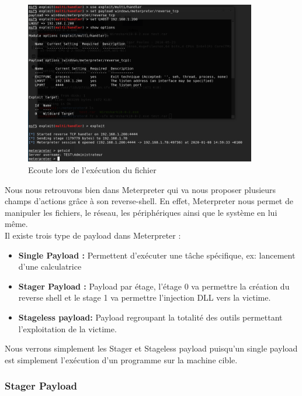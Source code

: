 \begin{figure}[htp!]
  \centering
  \setlength\figureheight{7cm}
  \setlength\figurewidth{9cm}
  \includegraphics[width=0.9\textwidth]{oui/Ancien/imangeancien/meterpreter/msf.PNG}
  \caption{Ecoute lors de l'exécution du fichier}
  \label{fig:courbe-tikz}
\end{figure}

Nous nous retrouvons bien dans Meterpreter qui va nous proposer plusieurs champs d'actions grâce à son reverse-shell. En effet, Meterpreter nous permet de manipuler les fichiers, le réseau, les périphériques ainsi que le système en lui même.\\



Il existe trois type de payload dans Meterpreter :

\begin{itemize}
    \item \textbf{Single Payload :} Permettent d'exécuter une tâche spécifique, ex: lancement d'une calculatrice
    
    \item \textbf{Stager Payload :} Payload par étage, l'étage 0 va permettre la création du reverse shell et le stage 1 va permettre l'injection DLL vers la victime.
    \item \textbf{Stageless payload:} Payload regroupant la totalité des outils permettant l'exploitation de la victime.
\end{itemize}

Nous verrons simplement les Stager et Stageless payload puisqu'un single payload est simplement l'exécution d'un programme sur la machine cible. 

\subsubsection{Stager Payload}

